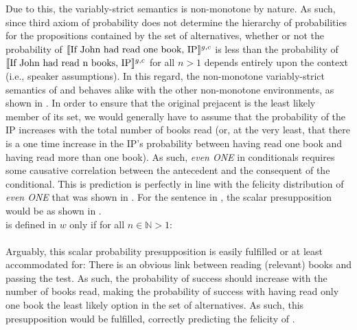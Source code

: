 Due to this, the variably-strict semantics is non-monotone by nature. As such, since  third axiom of probability does not determine the hierarchy of probabilities for the propositions contained by the set of alternatives, whether or not the probability of $\intension[g,c]{If John had read one book, IP}$ is less than the probability of $\intension[g,c]{If John had read n books, IP}$ for all $n>1$ depends entirely upon the context (i.e., speaker assumptions). In this regard, the non-monotone variably-strict semantics of \textcite{Stalnaker1968} and \textcite{Lewis1973} behaves alike with the other non-monotone environments, as shown in . In order to ensure that the original prejacent is the least likely member of its set, we would generally have to assume that the probability of the IP increases with the total number of books read (or, at the very least, that there is a one time increase in the IP's probability between having read one book and having read more than one book). As such, \textit{even \MakeUppercase{one}} in conditionals requires some causative correlation between the antecedent and the consequent of the conditional. This is prediction is perfectly in line with the felicity distribution of \textit{even \MakeUppercase{one}} that was shown in . For the sentence in , the scalar presupposition would be as shown in .
\ex
{}\\ is defined in $w$ only if for all $n\in\mathbb{N}>1$:\\
\\
\xe
Arguably, this scalar probability presupposition is easily fulfilled or at least accommodated for: There is an obvious link between reading (relevant) books and passing the test. As such, the probability of success should increase with the number of books read, making the probability of success with having read only one book the least likely option in the set of alternatives. As such, this presupposition would be fulfilled, correctly predicting the felicity of .

